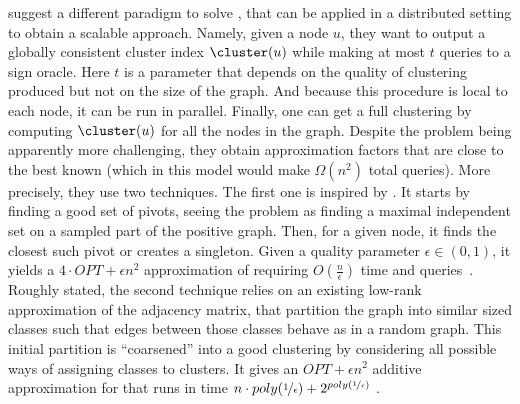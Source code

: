 \begin{aside}
\Textcite{Bonchi2013} suggest a different paradigm to solve \pcc{}, that can be applied in a
distributed setting to obtain a scalable approach. Namely, given a node $u$, they want to output a
globally consistent cluster index $\cluster(u)$ while making at most $t$ queries to a sign oracle.
Here $t$ is a parameter that depends on the quality of clustering produced but not on the size of
the graph. And because this procedure is local to each node, it can be run in parallel. Finally, one
can get a full clustering by computing $\cluster(u)$ for all the nodes in the graph. Despite the
problem being apparently more challenging, they obtain approximation factors that are close to the
best known (which in this model would make $\Omega(n^2)$ total queries). More precisely, they use
two techniques.
The first one is inspired by \ccpivot{}. It starts by finding a good set of pivots, seeing the
problem as finding a maximal independent set on a sampled part of the positive graph. Then, for a
given node, it finds the closest such pivot or creates a singleton. Given a quality parameter
$\epsilon\in(0,1)$, it yields a $4\cdot OPT + \epsilon n^2$ approximation of \mind{} requiring
$O(\frac{n}{\epsilon})$ time and queries~\autocite[Theorem 3.3]{Bonchi2013}.
Roughly stated, the second technique relies on an existing low-rank approximation of the adjacency matrix,
that partition the graph into similar sized classes such that edges between those classes behave as
in a random graph. This initial partition is \enquote{coarsened} into a good clustering by
considering all possible ways of assigning classes to clusters. It gives an $OPT + \epsilon n^2$
additive approximation  for \mind{} that runs in time $n \cdot poly(\nicefrac{1}{\epsilon}) +
2^{poly(\nicefrac{1}{\epsilon})}$ \autocite[Corollary 3.7]{Bonchi2013}.
\end{aside}

